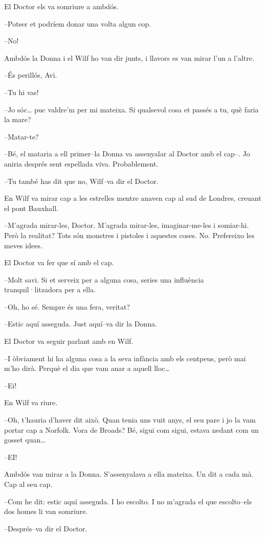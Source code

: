 El Doctor els va somriure a ambdós.

--Potser et podríem donar una volta algun cop.

--No!

Ambdós la Donna i el Wilf ho van dir junts, i llavors es van mirar l'un
a l'altre.

--És perillós, Avi.

--Tu hi vas!

--Jo sóc\ldots{} puc valdre'm per mi mateixa. Si qualsevol cosa et
passés a tu, què faria la mare?

--Matar-te?

--Bé, el mataria a ell primer--la Donna va assenyalar al Doctor amb el
cap--. Jo aniria després sent espellada viva. Probablement.

--Tu també has dit que no, Wilf--va dir el Doctor.

En Wilf va mirar cap a les estrelles mentre anaven cap al sud de
Londres, creuant el pont Bauxhall.

--M'agrada mirar-les, Doctor. M'agrada mirar-les, imaginar-me-les i
somiar-hi. Però la realitat? Tots són monstres i pistoles i aquestes
coses. No. Prefereixo les meves idees.

El Doctor va fer que sí amb el cap.

--Molt savi. Si et serveix per a alguna cosa, series una influència
tranquil·litzadora per a ella.

--Oh, ho sé. Sempre és una fera, veritat?

--Estic aquí asseguda. Just aquí--va dir la Donna.

El Doctor va seguir parlant amb en Wilf.

--I òbviament hi ha alguna cosa a la seva infància amb els centpeus,
però mai m'ho dirà. Perquè el dia que vam anar a aquell lloc\ldots{}

--Ei!

En Wilf va riure.

--Oh, t'hauria d'haver dit això. Quan tenia uns vuit anys, el seu pare i
jo la vam portar cap a Norfolk. Vora de Broads? Bé, sigui com sigui,
estava nedant com un gosset quan\ldots{}

--EI!

Ambdós van mirar a la Donna. S'assenyalava a ella mateixa. Un dit a cada
mà. Cap al seu cap.

--Com he dit: estic aquí asseguda. I ho escolto. I no m'agrada el que
escolto--els dos homes li van somriure.

--Després--va dir el Doctor.

